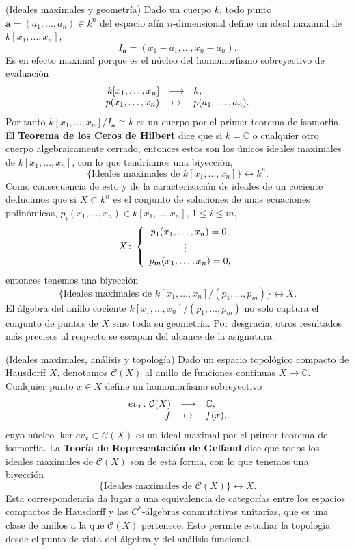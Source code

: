\textrm{\normalfont (Ideales maximales y geometría)} Dado
un cuerpo \(k\), todo punto \(\mathbf{a}=(a_1,\dots,a_n)\in k^n\) del
espacio afín \(n\)-dimensional define un ideal maximal de
\(k[x_1,\dots,x_n]\), \[I_{\mathbf{a}}=(x_1-a_1,\dots,x_n-a_n).\]
Es en efecto maximal porque es el núcleo del homomorfismo sobreyectivo
de evaluación
\[\begin{array}{rcl} k[x_1,\dots,x_n]&\longrightarrow& k,\cr p(x_1,\dots,x_n)&\mapsto&p(a_1,\dots,a_n). \end{array}\]
Por tanto \(k[x_1,\dots,x_n]/I_{\mathbf{a}}\cong k\) es un cuerpo por
el primer teorema de isomorfía. El \textbf{Teorema de los Ceros de
Hilbert} dice que si \(k=\mathbb C\) o cualquier otro cuerpo
algebraicamente cerrado, entonces estos son los únicos ideales maximales
de \(k[x_1,\dots,x_n]\), con lo que tendríamos una biyección,
\[\{\text{Ideales maximales de }k[x_1,\dots,x_n]\}\longleftrightarrow k^n.\]
Como consecuencia de esto y de la caracterización de ideales de un
cociente deducimos que si \(X\subset k^n\) es el conjunto de soluciones
de unas ecuaciones polinómicas,
\(p_i(x_1,\dots,x_n)\in k[x_1,\dots,x_n]\), \(1\leq i\leq m\),
\[X\colon\left\{ \begin{array}{c} p_1(x_1,\dots,x_n)=0,\cr \vdots\quad\cr p_m(x_1,\dots,x_n)=0, \end{array} \right.\]
entonces tenemos una biyección
\[\{\text{Ideales maximales de }k[x_1,\dots,x_n]/(p_1,\dots,p_m)\}\longleftrightarrow X.\]
El álgebra del anillo cociente \(k[x_1,\dots,x_n]/(p_1,\dots,p_m)\) no
solo captura el conjunto de puntos de \(X\) sino toda su geometría. Por
desgracia, otros resultados más precisos al respecto se escapan del
alcance de la asignatura. 

\textrm{\normalfont (Ideales maximales, análisis y topología)}
Dado un espacio topológico compacto de Hausdorff \(X\), denotamos
\(\mathcal C(X)\) al anillo de funciones continuas
\(X\rightarrow \mathbb C\). Cualquier punto \(x\in X\) define un
homomorfismo sobreyectivo
\[\begin{array}{rcl} ev_x\colon\mathcal C(X)&\longrightarrow& \mathbb C,\cr f&\mapsto&f(x), \end{array}\]
cuyo núcleo \(\ker ev_x\subset\mathcal C(X)\) es un ideal maximal por el
primer teorema de isomorfía. La \textbf{Teoría de Representación de
Gelfand} dice que todos los ideales maximales de \(\mathcal C(X)\) son
de esta forma, con lo que tenemos una biyección
\[\{\text{Ideales maximales de }\mathcal C(X)\}\longleftrightarrow X.\]
Esta correspondencia da lugar a una equivalencia de categorías entre los
espacios compactos de Hausdorff y las \(C^{\ast}\)-álgebras conmutativas
unitarias, que es una clase de anillos a la que \(\mathcal C(X)\)
pertenece. Esto permite estudiar la topología desde el punto de vista
del álgebra y del análisis funcional. 
